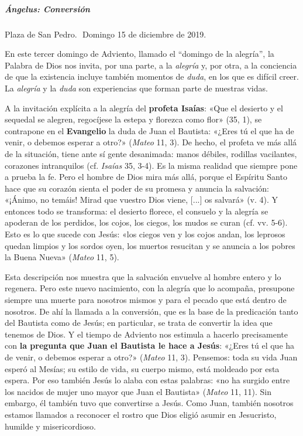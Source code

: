 \documentclass[]{article}
\let\oldsubparagraph\subparagraph
\renewcommand{\subparagraph}[1]{\oldsubparagraph{#1}\mbox{}}
\begin{document}
\subparagraph{Ángelus: Conversión}\label{uxe1ngelus-conversiuxf3n}

Plaza de San Pedro.  Domingo 15 de diciembre de 2019.

En este tercer domingo de Adviento, llamado el ``domingo de la
alegría'', la Palabra de Dios nos invita, por una parte, a la
\emph{alegría} y, por otra, a la conciencia de que la existencia incluye
también momentos de \emph{duda}, en los que es difícil creer. La
\emph{alegría} y la \emph{duda} son experiencias que forman parte de
nuestras vidas.

A la invitación explícita a la alegría del \textbf{profeta Isaías}: «Que
el desierto y el sequedal se alegren, regocíjese la estepa y florezca
como flor» (35, 1), se contrapone en el \textbf{Evangelio} la duda de
Juan el Bautista: «¿Eres tú el que ha de venir, o debemos esperar a
otro?» (\emph{Mateo} 11, 3). De hecho, el profeta ve más allá de la
situación, tiene ante sí gente desanimada: manos débiles, rodillas
vacilantes, corazones intranquilos (cf. \emph{Isaías} 35, 3-4). Es la
misma realidad que siempre pone a prueba la fe. Pero el hombre de Dios
mira más allá, porque el Espíritu Santo hace que su corazón sienta el
poder de su promesa y anuncia la salvación: «¡Ánimo, no temáis! Mirad
que vuestro Dios viene, {[}...{]} os salvará» (v. 4). Y entonces todo se
transforma: el desierto florece, el consuelo y la alegría se apoderan de
los perdidos, los cojos, los ciegos, los mudos se curan (cf. vv. 5-6).
Esto es lo que sucede con Jesús: «los ciegos ven y los cojos andan, los
leprosos quedan limpios y los sordos oyen, los muertos resucitan y se
anuncia a los pobres la Buena Nueva» (\emph{Mateo} 11, 5).

Esta descripción nos muestra que la salvación envuelve al hombre entero
y lo regenera. Pero este nuevo nacimiento, con la alegría que lo
acompaña, presupone siempre una muerte para nosotros mismos y para el
pecado que está dentro de nosotros. De ahí la llamada a la conversión,
que es la base de la predicación tanto del Bautista como de Jesús; en
particular, se trata de convertir la idea que tenemos de Dios. Y el
tiempo de Adviento nos estimula a hacerlo precisamente con \textbf{la
pregunta que Juan el Bautista le hace a Jesús}: «¿Eres tú el que ha de
venir, o debemos esperar a otro?» (\emph{Mateo} 11, 3). Pensemos: toda
su vida Juan esperó al Mesías; su estilo de vida, su cuerpo mismo, está
moldeado por esta espera. Por eso también Jesús lo alaba con estas
palabras: «no ha surgido entre los nacidos de mujer uno mayor que Juan
el Bautista» (\emph{Mateo} 11, 11). Sin embargo, él también tuvo que
convertirse a Jesús. Como Juan, también nosotros estamos llamados a
reconocer el rostro que Dios eligió asumir en Jesucristo, humilde y
misericordioso.
\end{document}
